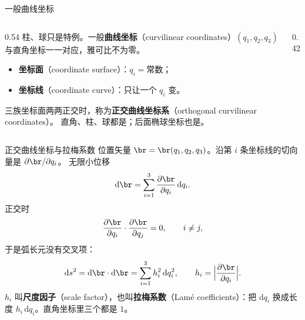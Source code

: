 \documentclass[fontset=windows, chinese, 10pt, xcolor=dvipsnames]{beamer}
\begin{document}
\begin{frame}{一般曲线坐标}
  \begin{columns}[c]
    \begin{column}{0.54\textwidth}
      柱、球只是特例。一般\textbf{曲线坐标}（curvilinear coordinates）$(q_1,q_2,q_3)$ 与直角坐标一一对应，雅可比不为零。
      \begin{itemize}
        \item \textbf{坐标面}（coordinate surface）：$q_i=\textrm{常数}$；
        \item \textbf{坐标线}（coordinate curve）：只让一个 $q_i$ 变。
      \end{itemize}
      三族坐标面两两正交时，称为\textbf{正交曲线坐标系}（orthogonal curvilinear coordinates）。
      直角、柱、球都是；后面椭球坐标也是。
    \end{column}
    \begin{column}{0.42\textwidth}
      \centering
      \scalebox{0.92}{}
    \end{column}
  \end{columns}
\end{frame}

\begin{frame}{正交曲线坐标与拉梅系数}
  位置矢量 $\br=\br(q_1,q_2,q_3)$。沿第 $i$ 条坐标线的切向量是 $\partial\br/\partial q_i$。
  无限小位移
  \begin{equation*}
    \mathrm{d}\br
    =\sum_{i=1}^{3}\frac{\partial\br}{\partial q_i}\,\mathrm{d}q_i.
  \end{equation*}
  正交时
  \begin{equation*}
    \frac{\partial\br}{\partial q_i}\cdot\frac{\partial\br}{\partial q_j}=0,
    \qquad i\neq j,
  \end{equation*}
  于是弧长元没有交叉项：
  \begin{equation*}
    \mathrm{d}s^2
    =\mathrm{d}\br\cdot\mathrm{d}\br
    =\sum_{i=1}^{3} h_i^2\,\mathrm{d}q_i^2,
    \qquad
    h_i=\Bigl|\frac{\partial\br}{\partial q_i}\Bigr|.
  \end{equation*}
  $h_i$ 叫\textbf{尺度因子}（scale factor），也叫\textbf{拉梅系数}（Lamé coefficients）：把 $\mathrm{d}q_i$ 换成长度 $h_i\,\mathrm{d}q_i$。直角坐标里三个都是 $1$。
\end{frame}
\end{document}
